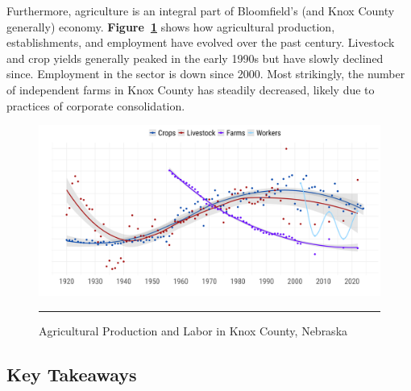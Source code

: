 \noindent Furthermore, agriculture is an integral part of Bloomfield's (and Knox County generally) economy. \textbf{Figure~\ref{fig:agProduction}} shows how agricultural production, establishments, and employment have evolved over the past century. Livestock and crop yields generally peaked in the early 1990s but have slowly declined since. Employment in the sector is down since 2000. Most strikingly, the number of independent farms in Knox County has steadily decreased, likely due to practices of corporate consolidation.

\begin{figure}[H]
\centering
\begin{framed}
    \caption{Agricultural Production and Labor in Knox County, Nebraska}
    \label{fig:agProduction}
    \includegraphics[width=\linewidth]{figures/ag_production.png}
    \rule[-5pt]{\linewidth}{0.4pt}
\end{framed}
\end{figure}

\pagebreak
\subsection*{Key Takeaways}